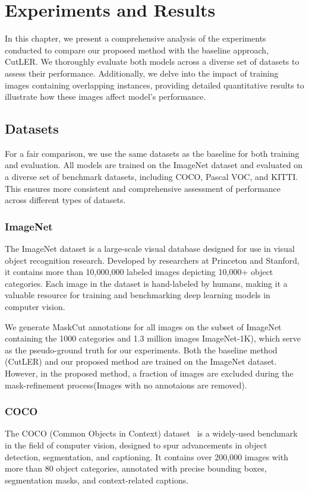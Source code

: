 \chapter{Experiments and Results}\label{chap:experiments}
In this chapter, we present a comprehensive analysis of the experiments conducted to compare our proposed method with the baseline approach, CutLER. We thoroughly evaluate both models across a diverse set of datasets to assess their performance. Additionally, we delve into the impact of training images containing overlapping instances, providing detailed quantitative results to illustrate how these images affect model's performance. 

\section{Datasets}
For a fair comparison, we use the same datasets as the baseline for both training and evaluation. All models are trained on the ImageNet dataset and evaluated on a diverse set of benchmark datasets, including COCO, Pascal VOC, and KITTI. This ensures more consistent and comprehensive assessment of performance across different types of datasets.

\subsection{ImageNet}
The ImageNet dataset is a large-scale visual database designed for use in visual object recognition research. Developed by researchers at Princeton and Stanford, it contains more than 10,000,000 labeled images depicting 10,000+ object categories. Each image in the dataset is hand-labeled by humans, making it a valuable resource for training and benchmarking deep learning models in computer vision.

We generate MaskCut annotations for all images on the subset of ImageNet containing the 1000 categories and 1.3 million images ImageNet-1K), which serve as the pseudo-ground truth for our experiments. Both the baseline method (CutLER) and our proposed method are trained on the ImageNet dataset. However, in the proposed method, a fraction of images are excluded during the mask-refinement process(Images with no annotaions are removed).

\subsection{COCO}
The COCO (Common Objects in Context) dataset~\cite{lin2015microsoftcococommonobjects} is a widely-used benchmark in the field of computer vision, designed to spur advancements in object detection, segmentation, and captioning. It contains over 200,000 images with more than 80 object categories, annotated with precise bounding boxes, segmentation masks, and context-related captions. 

